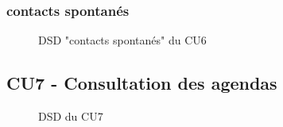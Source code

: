 \subsubsection{contacts spontanés}
\begin{figure}[H]
\noindent{}
\caption{DSD "contacts spontanés" du CU6}
\end{figure}


\subsection{CU7 - Consultation des agendas}
\begin{figure}[H]
\noindent{}
\caption{DSD du CU7}
\modificationFigure{}
\end{figure}

